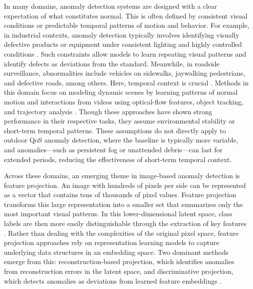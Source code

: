 \documentclass{article}
\begin{document}
In many domains, anomaly detection systems are designed with a clear expectation of what constitutes normal. This is often defined by consistent visual conditions or predictable temporal patterns of motion and behavior. For example, in industrial contexts, anomaly detection typically involves identifying visually defective products or equipment under consistent lighting and highly controlled conditions \cite{bergmann2019mvtec, tang2023reliable}. Such constraints allow models to learn repeating visual patterns and identify defects as deviations from the standard. Meanwhile, in roadside surveillance, abnormalities include vehicles on sidewalks, jaywalking pedestrians, and defective roads, among others. Here, temporal context is crucial \cite{ovhal2017analysis, rathee2023automated, santhosh2020anomaly, sultani2018real}. Methods in this domain focus on modeling dynamic scenes by learning patterns of normal motion and interactions from videos using optical-flow features, object tracking, and trajectory analysis \cite{santhosh2020anomaly}. Though these approaches have shown strong performance in their respective tasks, they assume environmental stability or short-term temporal patterns. These assumptions do not directly apply to outdoor \ac{QoS} anomaly detection, where the baseline is typically more variable, and anomalies—such as persistent fog or unattended debris—can last for extended periods, reducing the effectiveness of short-term temporal context. 

Across these domains, an emerging theme in image-based anomaly detection is feature projection. An image with hundreds of pixels per side can be represented as a vector that contains tens of thousands of pixel values. Feature projection transforms this large representation into a smaller set that summarizes only the most important visual patterns. In this lower-dimensional latent space, class labels are then more easily distinguishable through the extraction of key features \cite{olszewski2024dimensionality, sakurada2014anomaly, zong2018deep}. Rather than dealing with the complexities of the original pixel space, feature projection approaches rely on representation learning models to capture underlying data structures in an embedding space. Two dominant methods emerge from this: reconstruction-based projection, which identifies anomalies from reconstruction errors in the latent space, and discriminative projection, which detects anomalies as deviations from learned feature embeddings \cite{mishra2021vt}.
\end{document}
